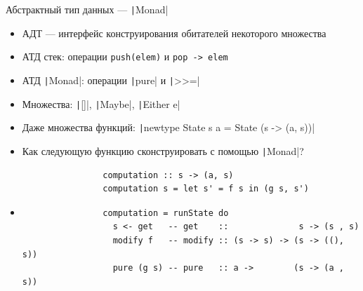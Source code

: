     \begin{frame}[fragile]{Абстрактный тип данных --- \texttt|Monad|}
        \vspace{-0.5em}
        \begin{itemize}
            \item[\defi] АДТ --- интерфейс конструирования обитателей некоторого множества
            \item[\eg] АТД стек: операции \texttt{push(elem)} и \texttt{pop -> elem}
            \item[\eg] АТД \texttt|Monad|: операции \texttt|pure| и \texttt|>>=|
            \item[\eg] Множества: \texttt|[]|, \texttt|Maybe|, \texttt|Either e|
            \item[\eg] Даже множества функций: \texttt|newtype State s a = State (s -> (a, s))|
            \item[\todo] Как следующую функцию сконструировать с помощью \texttt|Monad|?
            \begin{verbatim}
                computation :: s -> (a, s)
                computation s = let s' = f s in (g s, s')
            \end{verbatim}
            \item[\answer] \pause
            \begin{verbatim}
                computation = runState do
                  s <- get   -- get    ::              s -> (s , s)
                  modify f   -- modify :: (s -> s) -> (s -> ((), s))
                  pure (g s) -- pure   :: a ->        (s -> (a , s))
            \end{verbatim}
        \end{itemize}
    \end{frame}

